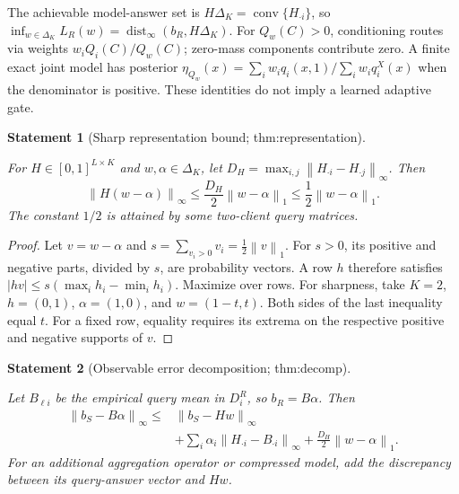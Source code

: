 \documentclass[11pt]{article}
\newtheorem{statement}{Statement}
\newcommand{\norm}[1]{\left\lVert#1\right\rVert}\newcommand{\qh}{\widehat H}
\begin{document}
The achievable model-answer set is $H\Delta_K=\operatorname{conv}\{H_{\cdot i}\}$, so $\inf_{w\in\Delta_K}L_R(w)=\operatorname{dist}_\infty(b_R,H\Delta_K)$. For $Q_w(C)>0$, conditioning routes via weights $w_iQ_i(C)/Q_w(C)$; zero-mass components contribute zero. A finite exact joint model has posterior $\eta_{Q_w}(x)=\sum_iw_iq_i(x,1)/\sum_iw_iq_i^X(x)$ when the denominator is positive. These identities do not imply a learned adaptive gate.

\begin{statement}[Sharp representation bound; thm:representation]\label{thm:representation}

For $H\in[0,1]^{L\times K}$ and $w,\alpha\in\Delta_K$, let $D_H=\max_{i,j}\norm{H_{\cdot i}-H_{\cdot j}}_\infty$. Then
\begin{equation}\label{eq:repr}
\norm{H(w-\alpha)}_\infty
\le\frac{D_H}{2}\norm{w-\alpha}_1
\le\frac12\norm{w-\alpha}_1.
\end{equation}
The constant $1/2$ is attained by some two-client query matrices.

\end{statement}

\begin{proof}
Let $v=w-\alpha$ and $s=\sum_{v_i>0}v_i=\frac12\norm v_1$. For $s>0$, its positive and negative parts, divided by $s$, are probability vectors. A row $h$ therefore satisfies $|hv|\le s(\max_i h_i-\min_i h_i)$. Maximize over rows. For sharpness, take $K=2$, $h=(0,1)$, $\alpha=(1,0)$, and $w=(1-t,t)$. Both sides of the last inequality equal $t$. For a fixed row, equality requires its extrema on the respective positive and negative supports of $v$.
\end{proof}

\begin{statement}[Observable error decomposition; thm:decomp]\label{thm:decomp}

Let $B_{\ell i}$ be the empirical query mean in $D_i^R$, so $b_R=B\alpha$. Then
\begin{equation}\label{eq:decomp}
\begin{split}
\norm{b_S-B\alpha}_\infty\le{}&\norm{b_S-Hw}_\infty\\
&+\sum_i\alpha_i\norm{H_{\cdot i}-B_{\cdot i}}_\infty
+\frac{D_H}{2}\norm{w-\alpha}_1.
\end{split}
\end{equation}
For an additional aggregation operator or compressed model, add the discrepancy between its query-answer vector and $Hw$.

\end{statement}
\end{document}
